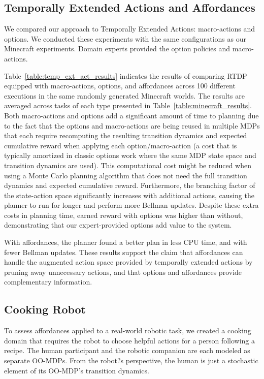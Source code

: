 \documentclass[letterpaper]{article}
\begin{document}
\subsection{Temporally Extended Actions and Affordances}

We compared our approach to Temporally Extended Actions: macro-actions
and options. We conducted these experiments with the same
configurations as our Minecraft experiments. Domain experts provided
the option policies and macro-actions.

Table~\ref{table:temp_ext_act_results} indicates the results of
comparing RTDP equipped with macro-actions, options, and affordances
across 100 different executions in the same randomly generated
Minecraft worlds. The results are averaged across tasks of each type
presented in Table~\ref{table:minecraft_results}. Both macro-actions
and options add a significant amount of time to planning due to the
fact that the options and macro-actions are being reused in
multiple MDPs that each require recomputing the resulting transition
dynamics and expected cumulative reward when applying each
option/macro-action (a cost that is typically amortized in classic
options work where the same MDP state space and transition dynamics
are used). This computational cost might be reduced when using a Monte
Carlo planning algorithm that does not need the full transition
dynamics and expected cumulative reward.  Furthermore, the branching
factor of the state-action space significantly increases with
additional actions, causing the planner to run for longer and perform
more Bellman updates.  Despite these extra costs in planning time,
earned reward with options was higher than without, demonstrating that
our expert-provided options add value to the system.

With affordances, the planner found a better plan in less CPU time,
and with fewer Bellman updates. These results support the claim that
affordances can handle the augmented action space provided by
temporally extended actions by pruning away unnecessary actions, and
that options and affordances provide complementary information.

\subsection{Cooking Robot}

To assess affordances applied to a real-world robotic task, we created
a cooking domain that requires the robot to choose helpful actions for
a person following a recipe. The human participant and the robotic companion are each modeled as separate
OO-MDPs. From the robot?s perspective, the human is just a stochastic element of its OO-MDP's
transition dynamics.
\end{document}

